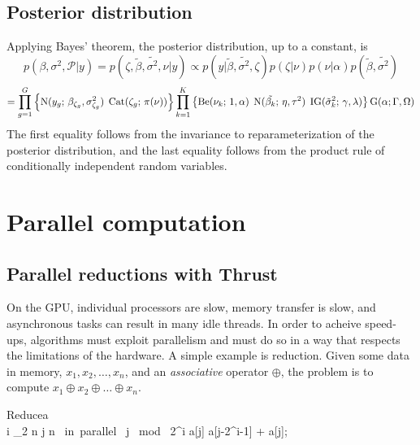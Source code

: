 \subsection{Posterior distribution}
\label{subsec:posterior}
Applying Bayes' theorem, the posterior distribution, up to a constant, is
\begin{equation*}
p(\beta,\sigma^2,\mathcal{P}|y) = p(\zeta, \tilde{\beta},\tilde{\sigma^2},\nu | y) \propto p(y|\tilde{\beta},\tilde{\sigma^2},\zeta) p(\zeta|\nu) p(\nu|\alpha)p(\tilde{\beta},\tilde{\sigma^2})
\end{equation*}
\begin{equation*}
= \prod_{g=1}^G \left\{ \operatorname{N}(y_g;\,\beta_{\zeta_g},\sigma^2_{\zeta_g})\; \operatorname{Cat}(\zeta_g;\, \pi(\nu)) \right\} \prod_{k=1}^K \left\{ \operatorname{Be}(\nu_k;\, 1, \alpha)\; \operatorname{N}(\tilde{\beta_k};\,\eta, \tau^2)\;\operatorname{IG}(\tilde{\sigma}^2_k;\,\gamma,\lambda)\right\} \operatorname{G}(\alpha;\Gamma,\Omega) 
\end{equation*}
The first equality follows from the  invariance to reparameterization of the posterior distribution, and the last equality follows from the product rule of conditionally independent random variables.

\section{Parallel computation}
\label{sec:computation}
\subsection{Parallel reductions with Thrust}
\label{subsec:reduce}
On the GPU, individual processors are slow, memory transfer is slow, and asynchronous tasks can result in many idle threads. In order to acheive speed-ups, algorithms must exploit parallelism and must do so in a way that respects the limitations of the hardware. A simple example is reduction. Given some data in memory, $x_1, x_2, \ldots, x_n$, and an \textit{associative} operator $\oplus$, the problem is to compute $x_1 \oplus x_2 \oplus \ldots \oplus x_n$. 

\begin{pseudocode}[ruled]{Reduce}{a}
\label{upsweep}
\\
\FOR i  \TO \log_2 n \DO \BEGIN
  \FOR j  \TO n \mbox{ in parallel }\DO \BEGIN
    \IF j \mbox{ mod } 2^i \DO \BEGIN
    a[j] \GETS a[j-2^{i-1}] + a[j];\\
    \END \END \END
{}
\end{pseudocode}

